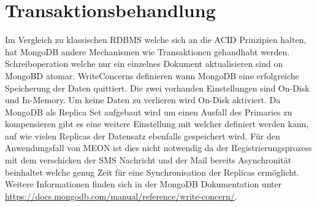 \section{Transaktionsbehandlung}
\label{transactions}
Im Vergleich zu klassischen \Gls{RDBMS} welche sich an die \Gls{ACID} Prinzipien halten, hat MongoDB andere Mechanismen wie Transaktionen gehandhabt werden. Schreiboperation welche nur ein einzelnes Dokument aktualisieren sind on MongoBD atomar. WriteConcerns definieren wann MongoDB eine erfolgreiche Speicherung der Daten quittiert. Die zwei vorhanden Einstellungen sind On-Disk und In-Memory. Um keine Daten zu verlieren wird On-Disk aktiviert.\newline
Da MongoDB als Replica Set aufgebaut wird um einen Ausfall des Primaries zu kompensieren gibt es eine weitere Einstellung mit welcher definiert werden kann, auf wie vielen Replicas der Datensatz ebenfalls gespeichert wird. Für den Anwendungsfall von MEON ist dies nicht notwendig da der Registrierungsprozess mit dem verschicken der SMS Nachricht und der Mail bereits Asynchronität beinhaltet welche genug Zeit für eine Synchronisation der Replicas ermöglicht. Weitere Informationen finden sich in der MongoDB Dokumentation unter \url{https://docs.mongodb.com/manual/reference/write-concern/}.
